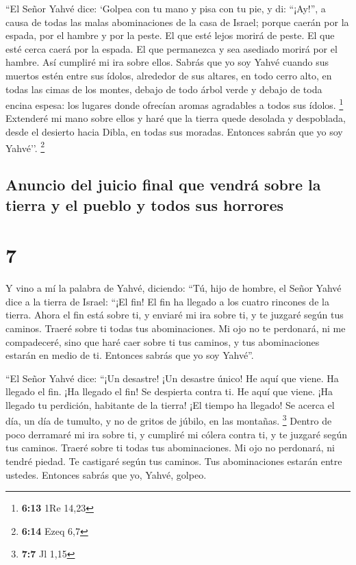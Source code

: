  ``El Señor Yahvé dice: `Golpea con tu mano y pisa con tu
pie, y di: ``¡Ay!'', a causa de todas las malas abominaciones de la casa
de Israel; porque caerán por la espada, por el hambre y por la peste.
 El que esté lejos morirá de peste. El que esté cerca
caerá por la espada. El que permanezca y sea asediado morirá por el
hambre. Así cumpliré mi ira sobre ellos.  Sabrás que yo
soy Yahvé cuando sus muertos estén entre sus ídolos, alrededor de sus
altares, en todo cerro alto, en todas las cimas de los montes, debajo de
todo árbol verde y debajo de toda encina espesa: los lugares donde
ofrecían aromas agradables a todos sus ídolos. \footnote{\textbf{6:13}
  1Re 14,23}  Extenderé mi mano sobre ellos y haré que la
tierra quede desolada y despoblada, desde el desierto hacia Dibla, en
todas sus moradas. Entonces sabrán que yo soy Yahvé''. \footnote{\textbf{6:14}
  Ezeq 6,7}

\hypertarget{anuncio-del-juicio-final-que-vendruxe1-sobre-la-tierra-y-el-pueblo-y-todos-sus-horrores}{%
\subsection{Anuncio del juicio final que vendrá sobre la tierra y el
pueblo y todos sus
horrores}\label{anuncio-del-juicio-final-que-vendruxe1-sobre-la-tierra-y-el-pueblo-y-todos-sus-horrores}}

\hypertarget{section-6}{%
\section{7}\label{section-6}}

 Y vino a mí la palabra de Yahvé, diciendo: 
``Tú, hijo de hombre, el Señor Yahvé dice a la tierra de Israel: ``¡El
fin! El fin ha llegado a los cuatro rincones de la tierra.
 Ahora el fin está sobre ti, y enviaré mi ira sobre ti, y
te juzgaré según tus caminos. Traeré sobre ti todas tus abominaciones.
 Mi ojo no te perdonará, ni me compadeceré, sino que haré
caer sobre ti tus caminos, y tus abominaciones estarán en medio de ti.
Entonces sabrás que yo soy Yahvé''.

 ``El Señor Yahvé dice: ``¡Un desastre! ¡Un desastre
único! He aquí que viene.  Ha llegado el fin. ¡Ha llegado
el fin! Se despierta contra ti. He aquí que viene.  ¡Ha
llegado tu perdición, habitante de la tierra! ¡El tiempo ha llegado! Se
acerca el día, un día de tumulto, y no de gritos de júbilo, en las
montañas. \footnote{\textbf{7:7} Jl 1,15}  Dentro de poco
derramaré mi ira sobre ti, y cumpliré mi cólera contra ti, y te juzgaré
según tus caminos. Traeré sobre ti todas tus abominaciones.
 Mi ojo no perdonará, ni tendré piedad. Te castigaré según
tus caminos. Tus abominaciones estarán entre ustedes. Entonces sabrás
que yo, Yahvé, golpeo.

